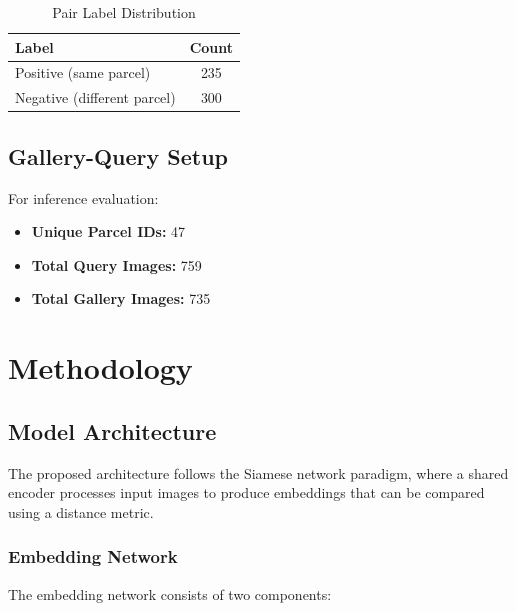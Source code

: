 \documentclass[12pt,a4paper]{article}
\begin{document}
\begin{table}[H]
\centering
\caption{Pair Label Distribution}
\label{tab:pair_labels}
\begin{tabular}{lc}
\toprule
\textbf{Label} & \textbf{Count} \\
\midrule
Positive (same parcel) & 235 \\
Negative (different parcel) & 300 \\
\bottomrule
\end{tabular}
\end{table}

\subsection{Gallery-Query Setup}

For inference evaluation:

\begin{itemize}
    \item \textbf{Unique Parcel IDs:} 47
    \item \textbf{Total Query Images:} 759
    \item \textbf{Total Gallery Images:} 735
\end{itemize}

\section{Methodology}
\label{sec:methodology}

\subsection{Model Architecture}

The proposed architecture follows the Siamese network paradigm, where a shared encoder processes input images to produce embeddings that can be compared using a distance metric.

\subsubsection{Embedding Network}

The embedding network consists of two components:
\end{document}
